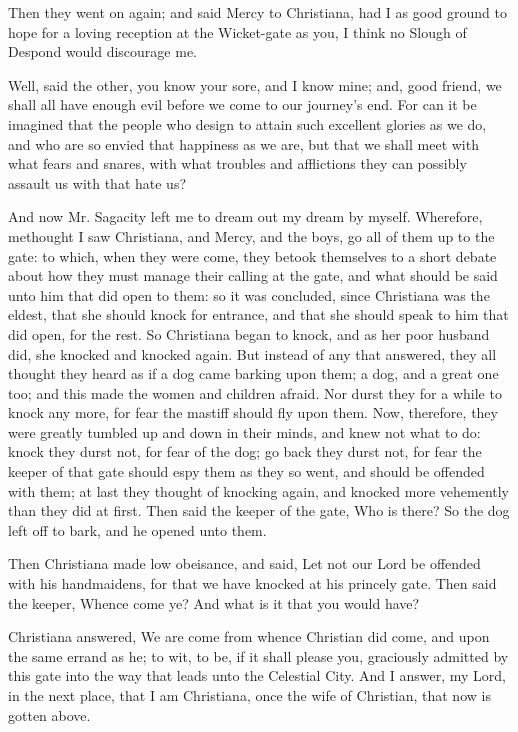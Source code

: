 Then they went on again; and said Mercy to Christiana, had I as good ground to hope for a loving reception at the Wicket-gate as you, I think no Slough of Despond would discourage me.

Well, said the other, you know your sore, and I know mine; and, good friend, we shall all have enough evil before we come to our journey's end. For can it be imagined that the people who design to attain such excellent glories as we do, and who are so envied that happiness as we are, but that we shall meet with what fears and snares, with what troubles and afflictions they can possibly assault us with that hate us?

And now Mr. Sagacity left me to dream out my dream by myself. Wherefore, methought I saw Christiana, and Mercy, and the boys, go all of them up to the gate: to which, when they were come, they betook themselves to a short debate about how they must manage their calling at the gate, and what should be said unto him that did open to them: so it was concluded, since Christiana was the eldest, that she should knock for entrance, and that she should speak to him that did open, for the rest. So Christiana began to knock, and as her poor husband did, she knocked and knocked again. But instead of any that answered, they all thought they heard as if a dog came barking upon them; a dog, and a great one too; and this made the women and children afraid. Nor durst they for a while to knock any more, for fear the mastiff should fly upon them. Now, therefore, they were greatly tumbled up and down in their minds, and knew not what to do: knock they durst not, for fear of the dog; go back they durst not, for fear the keeper of that gate should espy them as they so went, and should be offended with them; at last they thought of knocking again, and knocked more vehemently than they did at first. Then said the keeper of the gate, Who is there? So the dog left off to bark, and he opened unto them.

Then Christiana made low obeisance, and said, Let not our Lord be offended with his handmaidens, for that we have knocked at his princely gate. Then said the keeper, Whence come ye? And what is it that you would have?

Christiana answered, We are come from whence Christian did come, and upon the same errand as he; to wit, to be, if it shall please you, graciously admitted by this gate into the way that leads unto the Celestial City. And I answer, my Lord, in the next place, that I am Christiana, once the wife of Christian, that now is gotten above.

